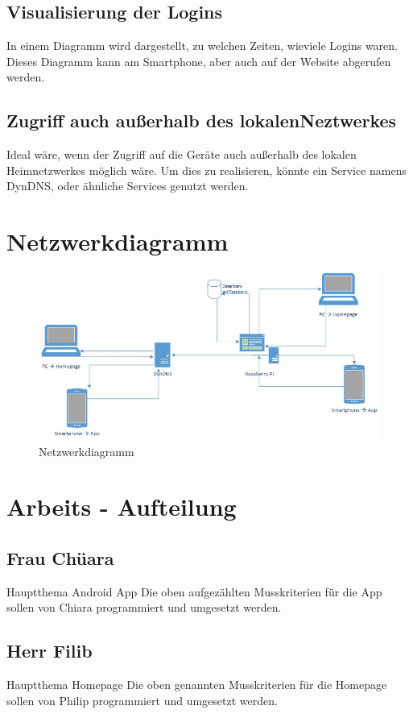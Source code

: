 \documentclass[10pt,a4paper]{report}
\begin{document}
\subsection{Visualisierung der Logins}
In einem Diagramm wird dargestellt, zu welchen Zeiten, wieviele Logins waren. Dieses Diagramm kann am Smartphone, aber auch auf der Website abgerufen werden.

\subsection{Zugriff auch außerhalb des lokalenNeztwerkes}
Ideal wäre, wenn der Zugriff auf die Geräte auch außerhalb des lokalen Heimnetzwerkes möglich wäre. Um dies zu realisieren, könnte ein Service namens DynDNS, oder ähnliche Services genutzt werden. 

\section{Netzwerkdiagramm}
\begin{figure}[ht]
	\centering
  	\includegraphics[width=1\textwidth]{netzwerkdiagramm.jpg}
	\caption{Netzwerkdiagramm}
	\label{netzwerkdiagramm}
\end{figure}

\section{Arbeits - Aufteilung}
\subsection{Frau Chüara}
Hauptthema Android App
Die oben aufgezählten Musskriterien für die App sollen von Chiara programmiert und umgesetzt werden.
\subsection{Herr Filib}
Hauptthema Homepage
Die oben genannten Musskriterien für die Homepage sollen von Philip programmiert und umgesetzt werden.
\end{document}
